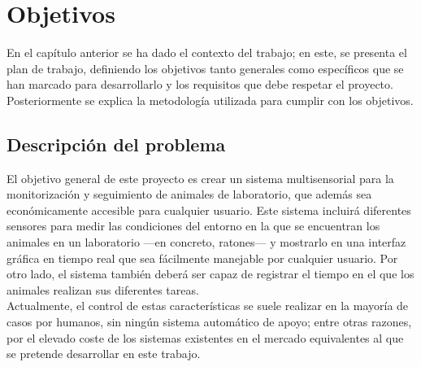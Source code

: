 \chapter{Objetivos}
\label{cap:capitulo2}



\vspace{1cm}

En el capítulo anterior se ha dado el contexto del trabajo; en este, se presenta el plan de trabajo, definiendo los objetivos tanto generales como específicos que se han marcado para desarrollarlo y los requisitos que debe respetar el proyecto. Posteriormente se explica la metodología utilizada para cumplir con los objetivos.\\

\section{Descripción del problema}
\label{sec:descripcion}

El objetivo general de este proyecto es crear un sistema multisensorial para la monitorización y seguimiento de animales de laboratorio, que además sea económicamente accesible para cualquier usuario. Este sistema incluirá diferentes sensores para medir las condiciones del entorno en la que se encuentran los animales en un laboratorio ---en concreto, ratones--- y mostrarlo en una interfaz gráfica en tiempo real que sea fácilmente manejable por cualquier usuario. Por otro lado, el sistema también deberá ser capaz de registrar el tiempo en el que los animales realizan sus diferentes tareas.\\

Actualmente, el control de estas características se suele realizar en la mayoría de casos por humanos, sin ningún sistema automático de apoyo; entre otras razones, por el elevado coste de los sistemas existentes en el mercado equivalentes al que se pretende desarrollar en este trabajo.\\

